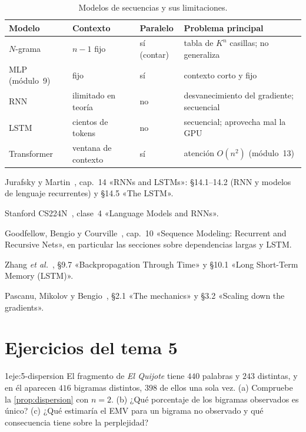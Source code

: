 \begin{table}[h]
\centering\small
\caption{Modelos de secuencias y sus limitaciones.}\label{tab:modelos-seq}
\begin{tabularx}{\textwidth}{@{}lll>{\raggedright\arraybackslash}X@{}}
\toprule
Modelo & Contexto & Paralelo & Problema principal \\
\midrule
$N$-grama & $n-1$ fijo & sí (contar) & tabla de $K^{n}$ casillas; no generaliza \\
MLP (módulo~9) & fijo & sí & contexto corto y fijo \\
RNN & ilimitado en teoría & no & desvanecimiento del gradiente; secuencial \\
LSTM & cientos de tokens & no & secuencial; aprovecha mal la GPU \\
Transformer & ventana de contexto & sí & atención $O(n^{2})$ (módulo~13) \\
\bottomrule
\end{tabularx}
\end{table}

\begin{lecturas}
\item Jurafsky y Martin~\cite{jm3}, cap.~14 «RNNs and LSTMs»: §14.1--14.2 (RNN y modelos de lenguaje recurrentes) y §14.5 «The LSTM».
\item Stanford CS224N~\cite{cs224n}, clase~4 «Language Models and RNNs».
\item Goodfellow, Bengio y Courville~\cite{gbc}, cap.~10 «Sequence Modeling: Recurrent and Recursive Nets», en particular las secciones sobre dependencias largas y LSTM.
\item Zhang \emph{et al.}~\cite{d2l}, §9.7 «Backpropagation Through Time» y §10.1 «Long Short-Term Memory (LSTM)».
\item Pascanu, Mikolov y Bengio~\cite{pascanu}, §2.1 «The mechanics» y §3.2 «Scaling down the gradients».
\end{lecturas}

\section*{Ejercicios del tema 5}

\begin{ejercicio}{1}{eje:5-dispersion}
El fragmento de \emph{El Quijote} tiene $440$ palabras y $243$ distintas, y en él aparecen $416$ bigramas distintos, $398$ de ellos una sola vez. (a) Compruebe la \cref{prop:dispersion} con $n=2$. (b) ¿Qué porcentaje de los bigramas observados es único? (c) ¿Qué estimaría el EMV para un bigrama no observado y qué consecuencia tiene sobre la perplejidad?
\end{ejercicio}

